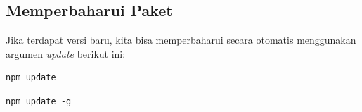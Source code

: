 \subsection{Memperbaharui Paket}

Jika terdapat versi baru, kita bisa memperbaharui secara otomatis menggunakan argumen \textit{update} berikut ini:

\lstset{language=bash,caption=Memperbaharui paket lokal}
\begin{lstlisting}
npm update
\end{lstlisting}

\lstset{language=bash, caption=Memperbaharui paket secara global}
\begin{lstlisting}
npm update -g
\end{lstlisting}

